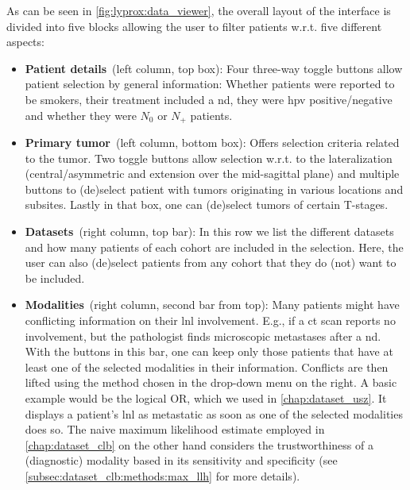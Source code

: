 \documentclass[\relativeRoot/main.tex]{subfiles}
\begin{document}
As can be seen in \cref{fig:lyprox:data_viewer}, the overall layout  of the interface is divided into five blocks allowing the user to filter patients w.r.t. five different aspects:

\begin{itemize}
    \item \textbf{Patient details}~(left column, top box): Four three-way toggle buttons allow patient selection by general information: Whether patients were reported to be smokers, their treatment included a \acrlong{nd}, they were \gls{hpv} positive/negative and whether they were $N_0$ or $N_+$ patients.
    \item \textbf{Primary tumor}~(left column, bottom box): Offers selection criteria related to the tumor. Two toggle buttons allow selection w.r.t. to the lateralization (central/asymmetric and extension over the mid-sagittal plane) and multiple buttons to (de)select patient with tumors originating in various locations and subsites. Lastly in that box, one can (de)select tumors of certain T-stages.
    \item \textbf{Datasets}~(right column, top bar): In this row we list the different datasets and how many patients of each cohort are included in the selection. Here, the user can also (de)select patients from any cohort that they do (not) want to be included.
    \item \textbf{Modalities}~(right column, second bar from top): Many patients might have conflicting information on their \gls{lnl} involvement. E.g., if a \gls{ct} scan reports no involvement, but the pathologist finds microscopic metastases after a \gls{nd}. With the buttons in this bar, one can keep only those patients that have at least one of the selected modalities in their information. Conflicts are then lifted using the method chosen in the drop-down menu on the right. A basic example would be the logical OR, which we used in \cref{chap:dataset_usz}. It displays a patient's \gls{lnl} as metastatic as soon as one of the selected modalities does so. The naive maximum likelihood estimate employed in \cref{chap:dataset_clb} on the other hand considers the trustworthiness of a (diagnostic) modality based in its sensitivity and specificity (see \cref{subsec:dataset_clb:methods:max_llh} for more details).

\end{itemize}
\end{document}
